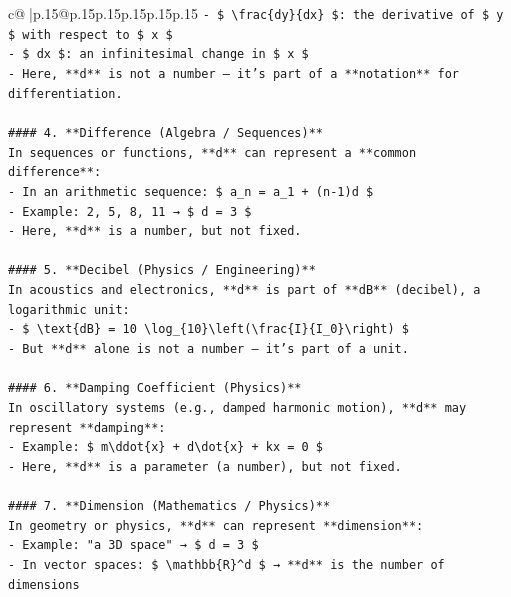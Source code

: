 \documentclass{article}
\begin{document}
{\begin{supertabular}{c@{$\;$}|p{.15\linewidth}@{}p{.15\linewidth}p{.15\linewidth}p{.15\linewidth}p{.15\linewidth}p{.15\linewidth}}
{{{\texttt{{-} \$ \textbackslash{}frac\{dy\}\{dx\} \$: the derivative of \$ y \$ with respect to \$ x \$} \\
\texttt{{-} \$ dx \$: an infinitesimal change in \$ x \$} \\
\texttt{{-} Here, **d** is not a number — it's part of a **notation** for differentiation.} \\
\\ 
\texttt{\#\#\#\# 4. **Difference (Algebra / Sequences)**} \\
\texttt{In sequences or functions, **d** can represent a **common difference**:} \\
\texttt{{-} In an arithmetic sequence: \$ a\_n = a\_1 + (n{-}1)d \$} \\
\texttt{{-} Example: 2, 5, 8, 11 → \$ d = 3 \$} \\
\texttt{{-} Here, **d** is a number, but not fixed.} \\
\\ 
\texttt{\#\#\#\# 5. **Decibel (Physics / Engineering)**} \\
\texttt{In acoustics and electronics, **d** is part of **dB** (decibel), a logarithmic unit:} \\
\texttt{{-} \$ \textbackslash{}text\{dB\} = 10 \textbackslash{}log\_\{10\}\textbackslash{}left(\textbackslash{}frac\{I\}\{I\_0\}\textbackslash{}right) \$} \\
\texttt{{-} But **d** alone is not a number — it's part of a unit.} \\
\\ 
\texttt{\#\#\#\# 6. **Damping Coefficient (Physics)**} \\
\texttt{In oscillatory systems (e.g., damped harmonic motion), **d** may represent **damping**:} \\
\texttt{{-} Example: \$ m\textbackslash{}ddot\{x\} + d\textbackslash{}dot\{x\} + kx = 0 \$} \\
\texttt{{-} Here, **d** is a parameter (a number), but not fixed.} \\
\\ 
\texttt{\#\#\#\# 7. **Dimension (Mathematics / Physics)**} \\
\texttt{In geometry or physics, **d** can represent **dimension**:} \\
\texttt{{-} Example: "a 3D space" → \$ d = 3 \$} \\
\texttt{{-} In vector spaces: \$ \textbackslash{}mathbb\{R\}\^{}d \$ → **d** is the number of dimensions} \\
\\ 
}}}
\end{supertabular}}
\end{document}
